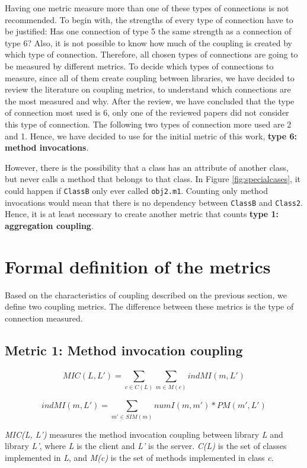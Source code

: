\documentclass[a4paper]{article}
\begin{document}
Having one metric measure more than one of these types of connections is not recommended. To begin with, the strengths of every type of connection have to be justified: Has one connection of type 5 the same strength as a connection of type 6? Also, it is not possible to know how much of the coupling is created by which type of connection. Therefore, all chosen types of connections are going to be measured by different metrics. To decide which types of connections to measure, since all of them create coupling between libraries, we have decided to review the literature on coupling metrics, to understand which connections are the most measured and why. After the review, we have concluded that the type of connection most used is 6, only one of the reviewed papers did not consider this type of connection. The following two types of connection more used are 2 and 1. Hence, we have decided to use for the initial metric of this work, \textbf{type 6: method invocations}.

However, there is the possibility that a class has an attribute of another class, but never calls a method that belongs to that class. In Figure \ref{fig:specialcases}, it could happen if \texttt{ClassB} only ever called \texttt{obj2.m1}. Counting only method invocations would mean that there is no dependency between \texttt{ClassB} and \texttt{Class2}. Hence, it is at least necessary to create another metric that counts \textbf{type 1: aggregation coupling}.

\section{Formal definition of the metrics}
Based on the characteristics of coupling described on the previous section, we define two coupling metrics. The difference between these metrics is the type of connection measured.

\subsection{Metric 1: Method invocation coupling}
\[
  MIC(L, L') = \sum_{c \in C(L)}^{} \sum_{m \in M(c)}^{} indMI(m, L')
\]

\[
  indMI(m, L') = \sum_{m' \in SIM(m)}^{} numI(m, m')*PM(m', L')
\]

\textit{MIC(L, L')} measures the method invocation coupling between library \textit{L} and library \textit{L'}, where \textit{L} is the client and \textit{L'} is the server. \textit{C(L)} is the set of classes implemented in \textit{L}, and \textit{M(c)} is the set of methods implemented in class \textit{c}.
\end{document}
